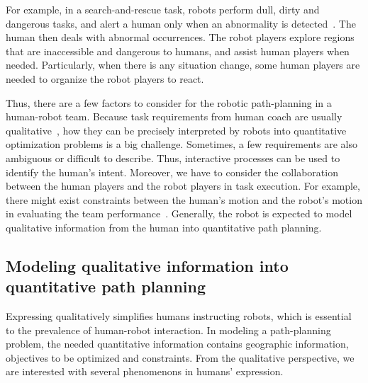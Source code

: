 \documentclass[phd]{byuprop}
\begin{document}
For example, in a search-and-rescue task, robots perform dull, dirty and dangerous tasks, and alert a human only when an abnormality is detected~\cite{Nourbakhsh2005}.
The human then deals with abnormal occurrences.
The robot players explore regions that are inaccessible and dangerous to humans, and assist human players when needed.
Particularly, when there is any situation change, some human players are needed to organize the robot players to react.

Thus, there are a few factors to consider for the robotic path-planning in a human-robot team.
Because task requirements from human coach are usually qualitative~\cite{brenner2007mediating}, how they can be precisely interpreted by robots into quantitative optimization problems is a big challenge.
Sometimes, a few requirements are also ambiguous or difficult to describe.
Thus, interactive processes can be used to identify the human's intent.
Moreover, we have to consider the collaboration between the human players and the robot players in task execution.
For example, there might exist constraints between the human's motion and the robot's motion in evaluating the team performance~\cite{Yi2014a}.
Generally, the robot is expected to model qualitative information from the human into quantitative path planning.

\subsection{Modeling qualitative information into quantitative path planning}
\label{sec:intro:modeling_qualitative_information_into_quantitative_path_planning}

Expressing qualitatively simplifies humans instructing robots, which is essential to the prevalence of human-robot interaction. 
In modeling a path-planning problem, the needed quantitative information contains geographic information, objectives to be optimized and constraints.
From the qualitative perspective, we are interested with several phenomenons in humans' expression.
\end{document}

